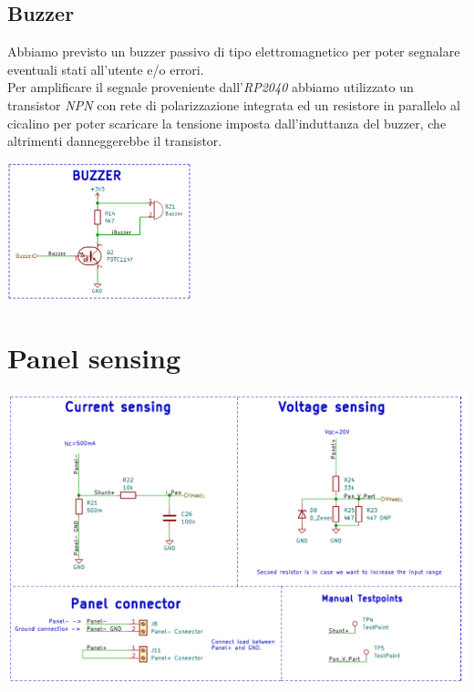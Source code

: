 \hypertarget{buzzer}{%
\subsection{\texorpdfstring{Buzzer}{Buzzer}}\label{buzzer}}

Abbiamo previsto un buzzer passivo di tipo elettromagnetico per poter
segnalare eventuali stati all'utente e/o errori.\\
Per amplificare il segnale proveniente dall'\textit{RP2040} abbiamo utilizzato un transistor \textit{NPN} con
rete di polarizzazione integrata ed un resistore in parallelo al
cicalino per poter scaricare la tensione imposta dall'induttanza del
buzzer, che altrimenti danneggerebbe il transistor.

\begin{center}
\includegraphics[width=0.40\textwidth]{figures/image38.png}
\captionsetup{type=figure}
\end{center}

\hypertarget{panel-sensing}{%
\section{\texorpdfstring{Panel sensing}{ Panel sensing}}\label{panel-sensing}}

\begin{center}
\includegraphics[scale=0.4]{figures/image24.png}
\captionsetup{type=figure}
\end{center}


